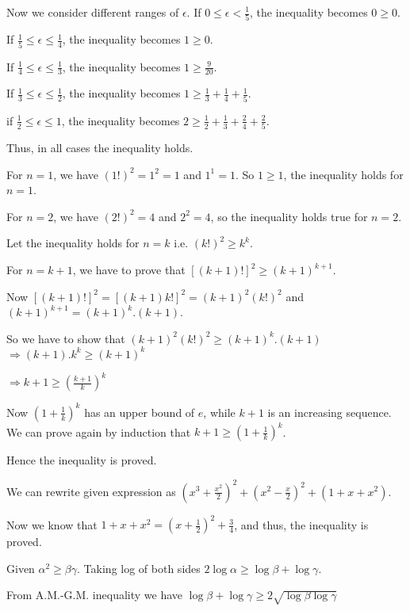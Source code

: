   Now we consider different ranges of $\epsilon$. If $0\leq \epsilon< \frac{1}{5}$, the inequality becomes
  $0\geq 0$.

  If $\frac{1}{5}\leq\epsilon\leq\frac{1}{4}$, the inequality becomes $1\geq 0$.

  If $\frac{1}{4}\leq\epsilon\leq\frac{1}{3}$, the inequality becomes $1\geq \frac{9}{20}$.

  If $\frac{1}{3}\leq\epsilon\leq\frac{1}{2}$, the inequality becomes $1\geq \frac{1}{3} + \frac{1}{4} +
  \frac{1}{5}$.

  if $\frac{1}{2}\leq\epsilon\leq1$, the inequality becomes $2\geq \frac{1}{2} + \frac{1}{3} + \frac{2}{4} +
  \frac{2}{5}$.

  Thus, in all cases the inequality holds.
\item For $n = 1$, we have $(1!)^2 = 1^2 = 1$ and $1^1 = 1$. So $1\geq 1$, the inequality holds for $n = 1$.

  For $n = 2$, we have $(2!)^2 = 4$ and $2^2 = 4$, so the inequality holds true for $n = 2$.

  Let the inequality holds for $n = k$ i.e. $(k!)^2\geq k^k$.

  For $n = k + 1$, we have to prove that $[(k + 1)!]^2\geq (k + 1)^{k + 1}$.

  Now $[(k + 1)!]^2 = [(k + 1)k!]^2 = (k + 1)^2(k!)^2$ and $(k + 1)^{k + 1} = (k + 1)^k.(k + 1)$.

  So we have to show that $(k + 1)^2(k!)^2\geq (k + 1)^k.(k+ 1)$ $\Rightarrow (k + 1).k^k\geq (k + 1)^k$

  $\Rightarrow k + 1\geq \left(\frac{k + 1}{k}\right)^k$

  Now $\left(1 + \frac{1}{k}\right)^k$ has an upper bound of $e$, while $k + 1$ is an increasing
  sequence. We can prove again by induction that $k + 1\geq \left(1 + \frac{1}{k}\right)^k$.

  Hence the inequality is proved.
\item We can rewrite given expression as $\left(x^3 + \frac{x^2}{2}\right)^2 + \left(x^2 -
  \frac{x}{2}\right)^2 + (1 + x + x^2)$.

  Now we know that $1 + x + x^2 = \left(x + \frac{1}{2}\right)^2+ \frac{3}{4}$, and thus, the inequality is
  proved.
\item Given $\alpha^2\geq \beta\gamma$. Taking log of both sides $2\log\alpha\geq \log\beta + \log\gamma$.

  From A.M.-G.M. inequality we have $\log\beta + \log\gamma\geq 2\sqrt{\log\beta\log\gamma}$

